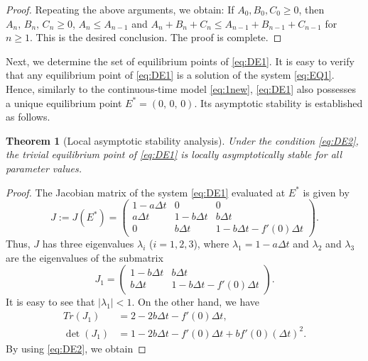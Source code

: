 \documentclass[12pt]{article}
\newtheorem{theorem}{Theorem}[section]
\theoremstyle{definition}
\theoremstyle{remark}
\numberwithin{equation}{section}
\begin{document}
{\begin{proof}
Repeating the above arguments, we obtain: If $A_0, B_0, C_0 \geq 0$, then $A_n,\,B_n,\,C_n \geq 0$, $A_n \leq A_{n - 1}$ and $A_n + B_n + C_n \leq A_{n - 1} + B_{n - 1} + C_{n - 1}$ for $n \geq 1$. This is the desired conclusion. The proof is complete.
\end{proof}
Next, we determine the set of equilibrium points of \eqref{eq:DE1}. It is easy to verify that any equilibrium point of \eqref{eq:DE1} is a solution of the system \eqref{eq:EQ1}. Hence, similarly to the continuous-time model \eqref{eq:1new}, \eqref{eq:DE1} also possesses a unique equilibrium point $E^* = (0,\,0,\,0)$. Its asymptotic stability is established as follows.
\begin{theorem}[Local asymptotic stability analysis]\label{Theorem5}
Under the condition \eqref{eq:DE2}, the trivial equilibrium point of \eqref{eq:DE1} is locally asymptotically stable for all parameter values.
\end{theorem}
\begin{proof}
The Jacobian matrix of the system \eqref{eq:DE1} evaluated at $E^*$ is given by
\begin{equation}\label{LAS}
J := J(E^*) = 
\begin{pmatrix}
1 - a\Delta t&0&0\\
a\Delta t&1 - b\Delta t& b\Delta t\\
0&b\Delta t & 1 - b\Delta t - f'(0)\Delta t
\end{pmatrix}.
\end{equation}
Thus, $J$ has three eigenvalues $\lambda_i$ ($i = 1, 2, 3$), where $\lambda_1 = 1 - a\Delta t$ and $\lambda_2$ and $\lambda_3$ are the eigenvalues of the submatrix
\begin{equation*}
J_1 = 
\begin{pmatrix}
1 - b\Delta t& b\Delta t\\
b\Delta t & 1 - b\Delta t - f'(0)\Delta t
\end{pmatrix}.
\end{equation*}
It is easy to see that $|\lambda_1| < 1$. On the other hand, we have
\begin{equation*}
\begin{split}
Tr(J_1) &= 2 - 2b\Delta t - f'(0)\Delta t,\\
%
\det(J_1) &= 1 - 2b\Delta t - f'(0)\Delta t + bf'(0)(\Delta t)^2.
\end{split}
\end{equation*}
By using \eqref{eq:DE2}, we obtain

\end{proof}}
\end{document}
